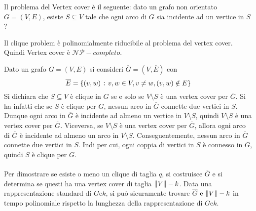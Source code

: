 \documentclass{subfiles}
\begin{document}
Il problema del Vertex cover è il seguente: dato un grafo non orientato \(G = (V, E)\), esiste \(S \subseteq V\) tale che ogni arco di \(G\) sia incidente ad un vertice in \(S\)?
\begin{Theorem}
    Il clique problem è polinomialmente riducibile al problema del vertex cover. Quindi Vertex cover è \(\mathcal{NP}-completo\).

    \begin{Proof*}
        Dato un grafo \(G = (V, E)\) si consideri \(\overline{G} = (V, \overline{E})\) con
        \[
            \overline{E} = \left\{(v, w) \operatorname{\: {:} \:} v, w \in V, v \ne w, (v, w) \notin E\right\}
        \]
        Si dichiara che \(S \subseteq V\) è clique in \(G\) se e solo se \(V \setminus S\) è una vertex cover per \(\overline{G}\).
        Si ha infatti che se \(S\) è clique per \(G\), nessun arco in \(\overline{G}\) connette due vertici in \(S\).
        Dunque ogni arco in \(\overline{G}\) è incidente ad almeno un vertice in \(V \setminus S\), quindi \(V \setminus S\) è una vertex cover per \(\overline{G}\).
        Viceversa, se \(V \setminus S\) è una vertex cover per \(\overline{G}\), allora ogni arco di \(\overline{G}\) è incidente ad almeno un arco in \(V \setminus S\).
        Conseguentemente, nessun arco in \(\overline{G}\) connette due vertici in \(S\).
        Indi per cui, ogni coppia di vertici in \(S\) è connesso in \(G\), quindi \(S\) è clique per \(G\).
        \\ \\
        Per dimostrare se esiste o meno un clique di taglia \(q\), si costruisce \(\overline{G}\) e si determina se questi ha una vertex cover di taglia \(\norm{V} - k\).
        Data una rappresentazione standard di \(G \text{e} k\), si può sicuramente trovare \(\overline{G} \text{e} \norm{V} - k\) in tempo polinomiale rispetto la lunghezza della rappresentazione di \(G \text{e} k\).
    \end{Proof*}
\end{Theorem}
\end{document}

